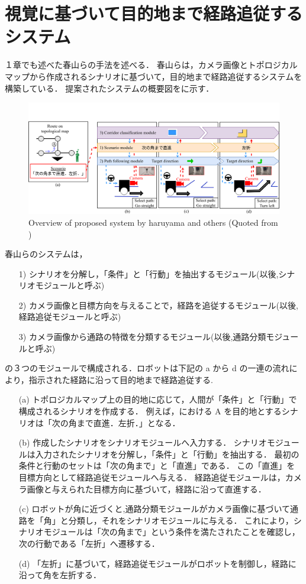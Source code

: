 \section{視覚に基づいて目的地まで経路追従するシステム}
１章でも述べた春山らの手法を述べる．
春山らは，カメラ画像とトポロジカルマップから作成されるシナリオに基づいて，目的地まで経路追従するシステムを構築している．
提案されたシステムの概要図をに示す．

\begin{figure}[htbp]
  \centering
   \includegraphics[width=130mm]{images/pdf/haruyama/system.pdf}
   \caption[Overview of proposed system by haruyama and others]{Overview of proposed system by haruyama and others (Quoted from \cite{haruyama2023})}
   \label{fig:sys}
\end{figure}

春山らのシステムは，
\begin{enumerate}
  \item [1)]シナリオを分解し，「条件」と「行動」を抽出するモジュール(以後,シナリオモジュールと呼ぶ)
  \item [2)]カメラ画像と目標方向を与えることで，経路を追従するモジュール(以後,経路追従モジュールと呼ぶ)
  \item [3)]カメラ画像から通路の特徴を分類するモジュール(以後,通路分類モジュールと呼ぶ)
\end{enumerate}

の３つのモジュールで構成される．ロボットは下記の a から d の一連の流れにより，指示された経路に沿って目的地まで経路追従する.
\begin{enumerate}
  \item [(a)] 
  トポロジカルマップ上の目的地に応じて，人間が「条件」と「行動」で構成されるシナリオを作成する．
  例えば，における A を目的地とするシナリオは「次の角まで直進．左折．」となる．
  \item [(b)] 
  作成したシナリオをシナリオモジュールへ入力する．
  シナリオモジュールは入力されたシナリオを分解し，「条件」と「行動」を抽出する．
  最初の条件と行動のセットは「次の角まで」と「直進」である．
  この「直進」を目標方向として経路追従モジュールへ与える．
  経路追従モジュールは，カメラ画像と与えられた目標方向に基づいて，経路に沿って直進する．
  \item [(c)] 
  ロボットが角に近づくと,通路分類モジュールがカメラ画像に基づいて通路を「角」と分類し，それをシナリオモジュールに与える．
  これにより，シナリオモジュールは「次の角まで」という条件を満たされたことを確認し，次の行動である「左折」へ遷移する．
  \item [(d)]
  「左折」に基づいて，経路追従モジュールがロボットを制御し，経路に沿って角を左折する．
\end{enumerate}

